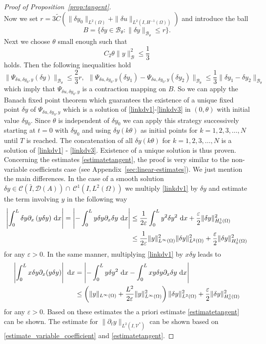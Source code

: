 \begin{proof}[Proof of Proposition~\ref{prop:tangent}]
\[\]
Now we set $r=3 \widetilde{C}\left(\|\delta y_0\|_{L^2(\Omega)}+\|\delta u\|_{L^2(I,H^{-1}(\Omega))}\right)$ and introduce the ball
\[
B=\{\delta y \in \mathcal B_{\theta}\colon \|\delta y\|_{\mathcal B_{\theta}}\leq r\}.
\]
Next we choose $\theta$ small enough such that
\[
C_2\theta\|y\|_{\mathcal B}^2\leq\frac{1}{3}
\]
holds. Then the following inequalities hold
\[
\|\Psi_{\delta u, \delta y_0,y}(\delta y)\|_{\mathcal B_{\theta}}\leq \frac{2}{3}r,~~\|\Psi_{\delta u, \delta y_0,y}(\delta y_1) - \Psi_{\delta u, \delta y_0,y}(\delta y_2)\|_{\mathcal B_{\theta}}\leq\frac{1}{3}\|\delta y_1-\delta y_2\|_{\mathcal B_{\theta}}
\]
which imply that $\Psi_{\delta u, \delta y_0,y}$ is a contraction mapping on $B$. So we can apply the Banach fixed point theorem which guarantees the existence of a unique fixed point $\delta y$ of $\Psi_{\delta u, \delta y_0,y}$ which is a solution of \eqref{linkdv1}-\eqref{linkdv3} in $(0,\theta)$ with initial value $\delta y_0$. Since $\theta$ is independent of $\delta y_0$ we can apply this strategy successively starting at $t=0$ with $\delta y_0$ and using $\delta y(k\theta)$ as initial points for $k=1,2,3,\ldots,N$ until $T$ is reached. The concatenation of all $\delta y(k\theta)$ for $k=1,2,3,\ldots,N$ is a solution of \eqref{linkdv1} - \eqref{linkdv3}. Existence of a unique solution is thus proven. Concerning the estimates \eqref{estimatetangent}, the proof is very similar to the non-variable coefficients case (see Appendix~\ref{sec:linear-estimates}). We just mention the main differences.  In the case of  a smooth solution $\delta y \in \mathcal C(\bar I,\mathcal D(A))\cap \,\mathcal C^1(I,L^2(\Omega))$ we multiply \eqref{linkdv1} by $\delta y$ and estimate the term involving $y$ in the following way
\begin{align*}
\left\lvert\int_0^L{\delta y \partial_x \left( y \delta y \right)}~\mathrm dx\right\rvert = \left\lvert-\int_0^L{y \delta y \partial_x \delta y}~\mathrm dx\right\rvert &\leq \frac{1}{2\varepsilon}\int_0^L{y^2 \delta y^2}~\mathrm dx + \frac{\varepsilon}{2}\|\delta y\|_{H^1_0(\Omega)}^2\\
&\leq \frac{1}{2\varepsilon}\lVert y\rVert_{L^{\infty}(\Omega)}^2 \|\delta y\|^2_{L^2(\Omega)} + \frac{\varepsilon}{2}\|\delta y\|_{H^1_0(\Omega)}^2
\end{align*}
for any $\varepsilon>0$.
In the same manner, multiplying \eqref{linkdv1} by $x\delta y$ leads to
\begin{align*}
\left\lvert\int_0^L{x\delta y \partial_x(y \delta y)}\right\rvert~\mathrm dx &= \left\lvert- \int_0^Ly \delta y^2~\mathrm dx - \int_0^Lxy\delta y
\partial_x \delta y~\mathrm dx\right\rvert\\
&\leq \left(\lVert y\rVert_{L^{\infty}(\Omega)}+\frac{L^2}{2\varepsilon}\lVert y\rVert_{L^{\infty}(\Omega)}^2\right)\|\delta y\|_{L^2(\Omega)}^2 +\frac{\varepsilon}{2}\|\delta y\|_{H^1_0(\Omega)}^2 \\
\end{align*}
for any $\varepsilon>0$. Based on these estimates the a priori estimate \eqref{estimatetangent} can be shown. The estimate for $\|\partial_t y\|_{L^2(I,\mathcal V^*)}$ can be shown based on \eqref{estimate_variable_coefficient} and \eqref{estimatetangent}.
\qquad\end{proof}

